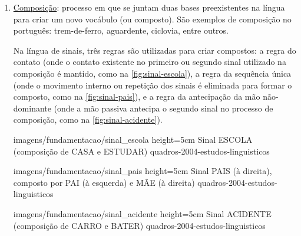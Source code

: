 \begin{enumerate}
\begin{enumerate}


        \item \underline{Composição}: processo em que se juntam duas bases preexistentes na língua para criar um novo vocábulo (ou composto). São exemplos de composição no português: trem-de-ferro, aguardente, ciclovia, entre outros.
        
        Na língua de sinais, três regras são utilizadas para criar compostos: a regra do contato (onde o contato existente no primeiro ou segundo sinal utilizado na composição é mantido, como na \autoref{fig:sinal-escola}), a regra da sequência única (onde o movimento interno ou repetição dos sinais é eliminada para formar o composto, como na \autoref{fig:sinal-pais}), e a regra da antecipação da mão não-dominante (onde a mão passiva antecipa o segundo sinal no processo de composição, como na \autoref{fig:sinal-acidente}).

            {imagens/fundamentacao/sinal_escola} %
            {height=5cm} %
            {Sinal ESCOLA (composição de CASA e ESTUDAR)} %
            {quadros-2004-estudos-linguisticos} %

            {imagens/fundamentacao/sinal_pais} %
            {height=5cm} %
            {Sinal PAIS (à direita), composto por PAI (à esquerda) e MÃE (à direita)} %
            {quadros-2004-estudos-linguisticos} %

            {imagens/fundamentacao/sinal_acidente} %
            {height=5cm} %
            {Sinal ACIDENTE (composição de CARRO e BATER)} %
            {quadros-2004-estudos-linguisticos} %




\end{enumerate}
\end{enumerate}
